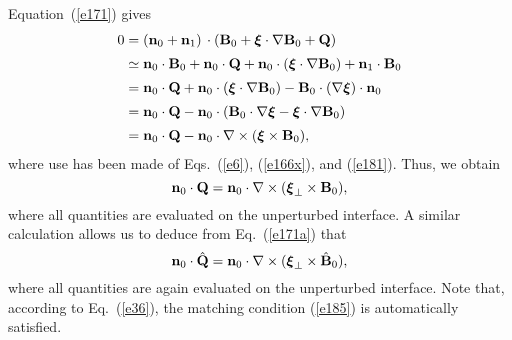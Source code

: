 \documentclass[12pt,prb,aps,notitlepage]{revtex4-1}
\newcommand{\bxi}{\mbox{\boldmath$\xi$}}
\begin{document}
Equation~(\ref{e171}) gives
\begin{align}
0&= ({\bf n}_0+{\bf n}_1)\,\cdot ({\bf B}_0+\bxi\cdot\nabla{\bf B}_0 + {\bf Q})\nonumber\\[0.5ex]
&\simeq {\bf n}_0\cdot{\bf B}_0+{\bf n}_0\cdot{\bf Q} + {\bf n}_0\cdot(\bxi\cdot\nabla{\bf B}_0) + {\bf n}_1\cdot{\bf B}_0\nonumber\\[0.5ex]
&= {\bf n}_0\cdot{\bf Q} +{\bf n}_0\cdot(\bxi\cdot\nabla{\bf B}_0) - {\bf B}_0\cdot(\nabla\bxi)\cdot{\bf n}_0\nonumber\\[0.5ex]
&= {\bf n}_0\cdot{\bf Q}-{\bf n}_0\cdot({\bf B}_0\cdot\nabla \bxi-\bxi\cdot\nabla{\bf B}_0)\nonumber\\[0.5ex]
&= {\bf n}_0\cdot{\bf Q} -{\bf n}_0\cdot\nabla\times (\bxi\times{\bf B}_0),
\end{align}
where use has been made of Eqs.~(\ref{e6}), (\ref{e166x}), and (\ref{e181}). 
Thus, we obtain
\begin{equation}\label{e185}
{\bf n}_0\cdot{\bf Q} = {\bf n}_0\cdot\nabla\times (\bxi_\perp\times{\bf B}_0),
\end{equation}
where all quantities are evaluated on the unperturbed interface. 
A similar calculation allows us to deduce from Eq.~(\ref{e171a}) that
\begin{equation}\label{e188v}
{\bf n}_0\cdot\hat{\bf Q} = {\bf n}_0\cdot\nabla\times (\bxi_\perp\times\hat{\bf B}_0),
\end{equation}
where all quantities are again evaluated on the unperturbed interface. Note that, according to  Eq.~(\ref{e36}),  the matching condition (\ref{e185}) is
automatically satisfied. 
\end{document}
